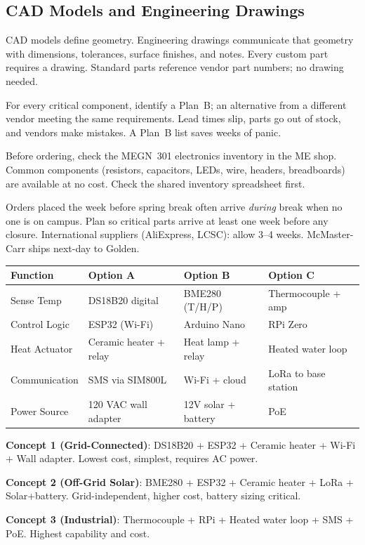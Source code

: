 \documentclass[11pt,letterpaper,twoside,openany]{book}
\begin{document}
\subsection{CAD Models and Engineering Drawings}
CAD models define geometry. Engineering drawings communicate that geometry with dimensions, tolerances, surface finishes, and notes. Every custom part requires a drawing. Standard parts reference vendor part numbers; no drawing needed.

\begin{tipbox}
For every critical component, identify a Plan~B; an alternative from a different vendor meeting the same requirements. Lead times slip, parts go out of stock, and vendors make mistakes. A Plan~B list saves weeks of panic.
\end{tipbox}

\begin{tipbox}
Before ordering, check the MEGN~301 electronics inventory in the ME shop. Common components (resistors, capacitors, LEDs, wire, headers, breadboards) are available at no cost. Check the shared inventory spreadsheet first.
\end{tipbox}

\begin{tipbox}
Orders placed the week before spring break often arrive \emph{during} break when no one is on campus. Plan so critical parts arrive at least one week before any closure. International suppliers (AliExpress, LCSC): allow 3--4 weeks. McMaster-Carr ships next-day to Golden.
\end{tipbox}

\begin{greenshieldbox}
\small
\begin{tabularx}{\textwidth}{l X X X}
\toprule
\textbf{Function} & \textbf{Option A} & \textbf{Option B} & \textbf{Option C} \\
\midrule
Sense Temp & DS18B20 digital & BME280 (T/H/P) & Thermocouple + amp \\
Control Logic & ESP32 (Wi-Fi) & Arduino Nano & RPi Zero \\
Heat Actuator & Ceramic heater + relay & Heat lamp + relay & Heated water loop \\
Communication & SMS via SIM800L & Wi-Fi + cloud & LoRa to base station \\
Power Source & 120 VAC wall adapter & 12V solar + battery & PoE \\
\bottomrule
\end{tabularx}

\textbf{Concept 1 (Grid-Connected)}: DS18B20 + ESP32 + Ceramic heater + Wi-Fi + Wall adapter. Lowest cost, simplest, requires AC power.

\textbf{Concept 2 (Off-Grid Solar)}: BME280 + ESP32 + Ceramic heater + LoRa + Solar+battery. Grid-independent, higher cost, battery sizing critical.

\textbf{Concept 3 (Industrial)}: Thermocouple + RPi + Heated water loop + SMS + PoE. Highest capability and cost.
\end{greenshieldbox}
\end{document}
